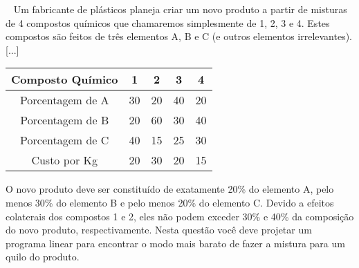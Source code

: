 ~
Um fabricante de plásticos planeja criar um novo produto a partir de misturas de 4 compostos químicos que chamaremos simplesmente de 1, 2, 3 e 4. Estes compostos são feitos de três elementos A, B e C (e outros elementos irrelevantes). [...]

\begin{table}[H]
    \centering
    \begin{tabular}{ccccc}
        \toprule
        Composto Químico & 1 & 2 & 3 & 4 \\
        \midrule
        Porcentagem de A & 30 & 20 & 40 & 20 \\
        Porcentagem de B & 20 & 60 & 30 & 40 \\
        Porcentagem de C & 40 & 15 & 25 & 30 \\
        \midrule
        Custo por Kg & 20 & 30 & 20 & 15 \\
        \bottomrule
    \end{tabular}
\end{table}

O novo produto deve ser constituído de exatamente 20\% do elemento A, pelo menos 30\% do elemento B e pelo menos 20\% do elemento C. Devido a efeitos colaterais dos compostos 1 e 2, eles não podem exceder 30\% e 40\% da composição do novo produto, respectivamente. Nesta questão você deve projetar um programa linear para encontrar o modo mais barato de fazer a mistura para um quilo do produto.
